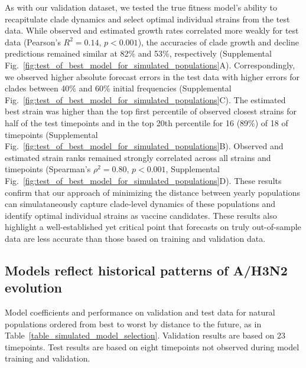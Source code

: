 As with our validation dataset, we tested the true fitness model's ability to recapitulate clade dynamics and select optimal individual strains from the test data.
While observed and estimated growth rates correlated more weakly for test data (Pearson's $R^2 = 0.14$, $p < 0.001$), the accuracies of clade growth and decline predictions remained similar at 82\% and 53\%, respectively (Supplemental Fig.~\ref{fig:test_of_best_model_for_simulated_populations}A).
Correspondingly, we observed higher absolute forecast errors in the test data with higher errors for clades between 40\% and 60\% initial frequencies (Supplemental Fig.~\ref{fig:test_of_best_model_for_simulated_populations}C).
The estimated best strain was higher than the top first percentile of observed closest strains for half of the test timepoints and in the top 20th percentile for 16 (89\%) of 18 of timepoints (Supplemental Fig.~\ref{fig:test_of_best_model_for_simulated_populations}B).
Observed and estimated strain ranks remained strongly correlated across all strains and timepoints (Spearman's $\rho^2 = 0.80$, $p < 0.001$, Supplemental Fig.~\ref{fig:test_of_best_model_for_simulated_populations}D).
These results confirm that our approach of minimizing the distance between yearly populations can simulataneously capture clade-level dynamics of these populations and identify optimal individual strains as vaccine candidates.
These results also highlight a well-established yet critical point that forecasts on truly out-of-sample data are less accurate than those based on training and validation data.

\subsection*{Models reflect historical patterns of A/H3N2 evolution}

\begin{table}[ht]
  \begin{center}
    \scalebox{0.9}{
      
    }
    \caption{
      Model coefficients and performance on validation and test data for natural populations ordered from best to worst by distance to the future, as in Table~\ref{table_simulated_model_selection}.
      Validation results are based on 23 timepoints.
      Test results are based on eight timepoints not observed during model training and validation.
    }
    \label{table_natural_model_selection}
  \end{center}
\end{table}

